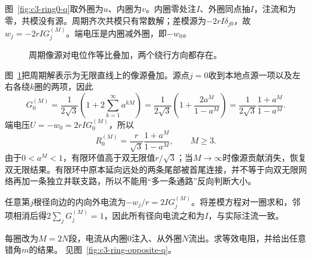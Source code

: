 \begin{solution}
图~\ref{fig:c3-ring0-q}取外圈为$u$、内圈为$v$。内圈零处注$I$、外圈同点抽$I$，注流和为零，共模没有源。周期齐次共模只有常数解；差模源为$-2rI\delta_{j0}$，故$w_j=-2rIG_j^{(M)}$。端电压是内圈减外圈，即$-w_0$。
\begin{figure}[H]\centering
{}
\caption{周期像源对电位作等比叠加，两个绕行方向都存在。}\label{fig:c3-ring0-s}
\end{figure}
图~\ref{fig:c3-ring0-s}把周期解表示为无限直线上的像源叠加。源点$j=0$收到本地点源一项以及左右各绕$k$圈的两项，因此
\[
 G_0^{(M)}=\frac1{2\sqrt3}\left(1+2\sum_{k=1}^{\infty}a^{kM}\right)
 =\frac1{2\sqrt3}\left(1+\frac{2a^M}{1-a^M}\right)
 =\frac1{2\sqrt3}\frac{1+a^M}{1-a^M}.
\]
端电压$U=-w_0=2rIG_0^{(M)}$，所以
\[
 \boxed{R_0^{(M)}=\frac r{\sqrt3}\frac{1+a^M}{1-a^M}},\qquad M\ge3.
\]
由于$0<a^M<1$，有限环值高于双无限值$r/\sqrt3$；当$M\to\infty$时像源贡献消失，恢复双无限结果。有限环中原本延向远处的两条尾部被首尾连接，并不等于向双无限网络再加一条独立并联支路，所以不能用“多一条通路”反向判断大小。

任意第$j$根径向边的内向外电流为$-w_j/r=2IG_j^{(M)}$。将差模方程对一圈求和，邻项相消后得$2\sum_jG_j^{(M)}=1$，因此所有径向电流之和为$I$，与实际注流一致。
\end{solution}

\begin{example}[内外圈错开半周的端口]\label{ex:c3-ring-opposite}
每圈改为$M=2N$段，电流从内圈$0$注入、从外圈$N$流出。求等效电阻，并给出任意错角$m$的结果。 见图~\ref{fig:c3-ring-opposite-q}。
\end{example}

